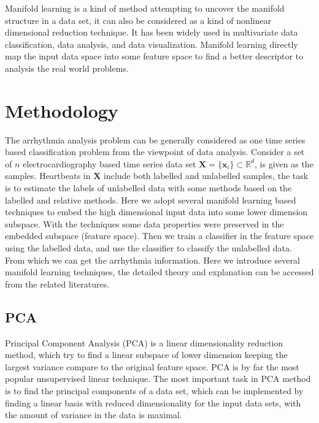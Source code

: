 \documentclass[journal]{IEEEtran}
\begin{document}
Manifold learning is a kind of method attempting to uncover the manifold structure in a data set, it can also be considered as a kind of nonlinear dimensional reduction technique.
It has been widely used in multivariate data classification, data analysis, and data visualization.
Manifold learning directly map the input data space into some feature space to find a better descriptor to analysis the real world problems. 




\lipsum[1-3]
%
%

\section{Methodology}
The arrhythmia analysis problem can be generally considered as one time series based classification problem from the viewpoint of data analysis.
Consider a set of $n$ electrocardiography based time series data set $\boldsymbol{X} = \{\boldsymbol{x}_i\} \subset \mathbb{R}^d$, is given as the samples.
Heartbeats in $\boldsymbol{X}$ include both labelled and unlabelled samples, the task is to estimate the labels of unlabelled data with some methods based on the labelled and relative methods.
Here we adopt several manifold learning based techniques to embed the high dimensional input data into some lower dimension subspace. 
With the techniques some data properties were preserved in the embedded subspace (feature space).
Then we train a classifier in the feature space using the labelled data, and use the classifier to classify the unlabelled data. From which we can get the arrhythmia information. 
Here we introduce several manifold learning techniques, the detailed theory and explanation can be accessed from the related literatures.


%
%

\subsection{PCA}
Principal Component Analysis (PCA) is a linear dimensionality reduction method, which try to find a linear subspace of lower dimension keeping the largest variance compare to the original feature space.
PCA is by far the most popular unsupervised linear technique.
The most important task in PCA method is to find the principal components of a data set, which can be implemented by finding a linear basis with reduced dimensionality for the input data sets, with the amount of variance in the data is maximal.
\end{document}

